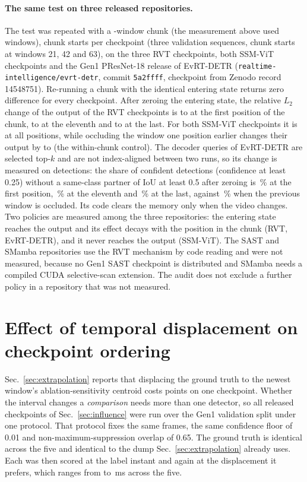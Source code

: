 \documentclass[10pt,twocolumn,letterpaper]{article}
\begin{document}
\paragraph{The same test on three released repositories.}
The test was repeated with a \raChunk-window chunk (the measurement above used \ssmChunkMeas{} windows), \raStarts{} chunk starts per checkpoint (three validation sequences, chunk starts at windows 21, 42 and 63), on the three RVT checkpoints, both SSM-ViT checkpoints and the Gen1 PResNet-18 release of EvRT-DETR (\texttt{realtime-intelligence/evrt-detr}, commit \texttt{5a2ffff}, checkpoint from Zenodo record 14548751). Re-running a chunk with the identical entering state returns zero difference for every checkpoint. After zeroing the entering state, the relative $L_{2}$ change of the output of the RVT checkpoints is \raEffRvtFirstLo{} to \raEffRvtFirstHi{} at the first position of the chunk, \raEffRvtMidLo{} to \raEffRvtMidHi{} at the eleventh and \raEffRvtLastLo{} to \raEffRvtLastHi{} at the last. For both SSM-ViT checkpoints it is \raEffSbMax{} at all \raChunk{} positions, while occluding the window one position earlier changes their output by \raInSsmLo{} to \raInSsmHi{} (the within-chunk control). The decoder queries of EvRT-DETR are selected top-$k$ and are not index-aligned between two runs, so its change is measured on detections: the share of confident detections (confidence at least 0.25) without a same-class partner of IoU at least 0.5 after zeroing is \raEvFirst\,\% at the first position, \raEvMid\,\% at the eleventh and \raEvLast\,\% at the last, against \raEvInOne\,\% when the previous window is occluded. Its code clears the memory only when the video changes. Two policies are measured among the three repositories: the entering state reaches the output and its effect decays with the position in the chunk (RVT, EvRT-DETR), and it never reaches the output (SSM-ViT). The SAST and SMamba repositories use the RVT mechanism by code reading and were not measured, because no Gen1 SAST checkpoint is distributed and SMamba needs a compiled CUDA selective-scan extension. The audit does not exclude a further policy in a repository that was not measured.

\section{Effect of temporal displacement on checkpoint ordering}
\label{sup:ordering}

Sec.~\ref{sec:extrapolation} reports that displacing the ground truth to the newest window's ablation-sensitivity centroid costs
\mapCost{} points on one checkpoint. Whether the interval changes a \emph{comparison} needs
more than one detector, so all \rankCkpts{} released checkpoints of Sec.~\ref{sec:influence} were run
over the Gen1 validation split under one protocol. That protocol fixes the same frames, the same confidence
floor of 0.01 and non-maximum-suppression overlap of 0.65. The ground truth is identical
across the five and identical to the dump Sec.~\ref{sec:extrapolation} already uses. Each was then scored at the label instant
and again at the displacement it prefers, which ranges from \rankArgLo{} to \rankArgHi\,ms
across the five.
\end{document}
